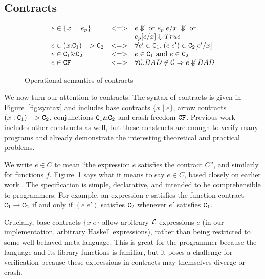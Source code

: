 \subsection{Contracts}


\begin{figure}
\[\begin{array}{lcl}
e \in \{ x\;\mid\;e_p\} & <=> &  e \not\Downarrow \mbox{ or } e_p[e/x] \not\Downarrow \mbox{ or} \\
                        &     &  e_p[e/x] \Downarrow True \\
e \in (x{:}{\tt C}_1) -> {\tt C}_2 & <=> &
                        \forall e' \in {\tt C}_1.\; (e\;e') \in {\tt C}_2[e'/x] \\
e \in {\tt C}_1 \& {\tt C}_2 & <=> & e \in {\tt C}_1 \mbox{ and } e \in {\tt C}_2 \\
e \in {\tt CF}            & <=> & \forall {\cal C}. BAD \not\in {\cal C} \Rightarrow e \not\Downarrow BAD
\end{array}
\]
\caption{Operational semantics of contracts} \label{f:contract-spec-op}
\end{figure}

We now turn our attention to contracts. The syntax of contracts
is given in Figure~\ref{fig:syntax} and includes base contracts
$\{ x \mid e \}$, arrow contracts $(x : {\tt C}_1) -> {\tt C}_2$, conjunctions
${\tt C}_1 \& {\tt C}_2$ and crash-freedom ${\tt CF}$. Previous work~\cite{xu+:contracts}
includes other constructs as well, but these constructs are enough to verify
many programs and already demonstrate the interesting theoretical and practical problems.

We write $e \in C$ to mean ``the expression $e$ satisfies the contract $C$'', and similarly
for functions $f$.
Figure~\ref{f:contract-spec-op} says what it means to say $e \in C$,
based closely on earlier work \cite{xu+:contracts}.  The specification is
simple, declarative, and intended to be comprehensible to programmers.
For example, an expression $e$ satisfies the function 
contract ${\tt C}_1 \rightarrow {\tt C}_2$ if and 
only if $(e\; e')$ satisfies ${\tt C}_2$ whenever $e'$ satisfies ${\tt C}_1$.

Crucially, base contracts $\{x|e\}$ allow arbitrary $\cal L$
expressions $e$ (in our implementation, arbitrary Haskell expressions),
rather than being restricted to some well behaved meta-language.  This
is great for the programmer because the language and its library
functions is familiar, but it poses a challenge for verification
because these expressions in contracts may themselves diverge or
crash.


